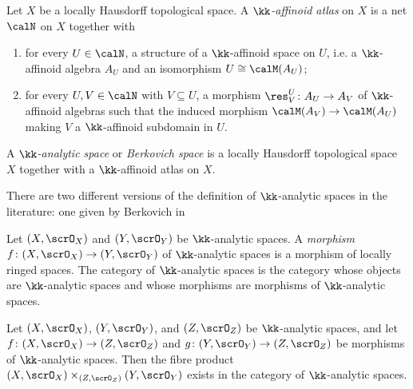     \begin{definition}\label{def:berkovich_analytic_space_by_net}
        Let \(X\) be a locally Hausdorff topological space.
        A \emph{\(\kk\)-affinoid atlas} on \(X\) is a net \(\calN\) on \(X\) together with
        \begin{enumerate}
            \item for every \(U \in \calN\), a structure of a \(\kk\)-affinoid space on \(U\), i.e. a \(\kk\)-affinoid algebra \(A_U\) and an isomorphism \(U \cong \calM(A_U)\);
            \item for every \(U, V \in \calN\) with \(V \subseteq U\), a morphism \(\res^U_V \colon A_U \to A_V\) of \(\kk\)-affinoid algebras such that the induced morphism \(\calM(A_V) \to \calM(A_U)\) making \(V\) a \(\kk\)-affinoid subdomain in \(U\).
        \end{enumerate}
        A \emph{\(\kk\)-analytic space} or \emph{Berkovich space} is a locally Hausdorff topological space \(X\) together with a \(\kk\)-affinoid atlas on \(X\).
    \end{definition}

    \begin{remark}\label{rmk:two_different_definition_of_analytic_space}
        There are two different versions of the definition of \(\kk\)-analytic spaces in the literature: one given by Berkovich in 
        \Yang{}
    \end{remark}


    \begin{definition}\label{def:category_of_analytic_space}
        Let \((X, \scrO_X)\) and \((Y, \scrO_Y)\) be \(\kk\)-analytic spaces. 
        A \emph{morphism} \(f \colon (X, \scrO_X) \to (Y, \scrO_Y)\) of \(\kk\)-analytic spaces is a morphism of locally ringed spaces. 
        The category of \(\kk\)-analytic spaces is the category whose objects are \(\kk\)-analytic spaces and whose morphisms are morphisms of \(\kk\)-analytic spaces.
    \end{definition}

    \begin{theorem}\label{thm:fibre_product_of_analytic_space_existss}
        Let \((X, \scrO_X)\), \((Y, \scrO_Y)\), and \((Z, \scrO_Z)\) be \(\kk\)-analytic spaces, and let \(f \colon (X, \scrO_X) \to (Z, \scrO_Z)\) and \(g \colon (Y, \scrO_Y) \to (Z, \scrO_Z)\) be morphisms of \(\kk\)-analytic spaces. 
        Then the fibre product \((X, \scrO_X) \times_{(Z, \scrO_Z)} (Y, \scrO_Y)\) exists in the category of \(\kk\)-analytic spaces.
    \end{theorem}

